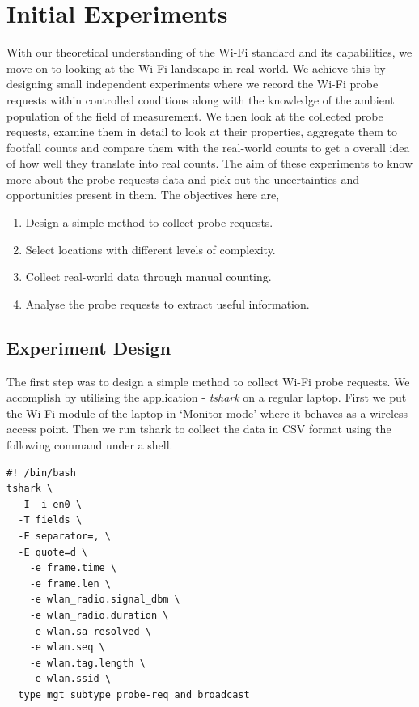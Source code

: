 \section{Initial Experiments}

With our theoretical understanding of the Wi-Fi standard and its capabilities, we move on to looking at the Wi-Fi landscape in real-world.
We achieve this by designing small independent experiments where we record the Wi-Fi probe requests within controlled conditions along with the knowledge of the ambient population of the field of measurement. 
We then look at the collected probe requests, examine them in detail to look at their properties, aggregate them to footfall counts and compare them with the real-world counts to get a overall idea of how well they translate into real counts.
The aim of these experiments to know more about the probe requests data and pick out the uncertainties and opportunities present in them.
The objectives here are,

\begin{enumerate}
  \setlength{\itemindent}{2em}
  \itemsep-0.25em
   \item Design a simple method to collect probe requests.
  \item Select locations with different levels of complexity.
  \item Collect real-world data through manual counting.
  \item Analyse the probe requests to extract useful information.
\end{enumerate}

\subsection{Experiment Design}

The first step was to design a simple method to collect Wi-Fi probe requests.
We accomplish by utilising the application - \textit{tshark} \cite{wireshark2} on a regular laptop.
First we put the Wi-Fi module of the laptop in `Monitor mode' where it behaves as a wireless access point.
Then we run tshark to collect the data in CSV format using the following command under a shell.

\begin{verbatim}
#! /bin/bash
tshark \
  -I -i en0 \
  -T fields \
  -E separator=, \
  -E quote=d \
    -e frame.time \
    -e frame.len \
    -e wlan_radio.signal_dbm \
    -e wlan_radio.duration \
    -e wlan.sa_resolved \
    -e wlan.seq \
    -e wlan.tag.length \
    -e wlan.ssid \
  type mgt subtype probe-req and broadcast
\end{verbatim}


